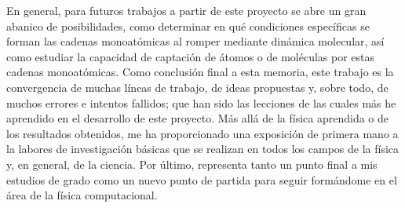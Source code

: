 
En general, para futuros trabajos a partir de este proyecto se abre un gran abanico de posibilidades, como determinar en qué condiciones específicas se forman las cadenas monoatómicas al romper mediante dinámica molecular, así como estudiar la capacidad de captación de átomos o de moléculas por estas cadenas monoatómicas. Como conclusión final a esta memoria, este trabajo es la convergencia de muchas líneas de trabajo, de ideas propuestas y, sobre todo, de muchos errores e intentos fallidos; que han sido las lecciones de las cuales más he aprendido en el desarrollo de este proyecto. Más allá de la física aprendida o de los resultados obtenidos, me ha proporcionado una exposición de primera mano a la labores de investigación básicas que se realizan en todos los campos de la física y, en general, de la ciencia. Por último, representa tanto un punto final a mis estudios de grado como un nuevo punto de partida para seguir formándome en el área de la física computacional. 

\newpage